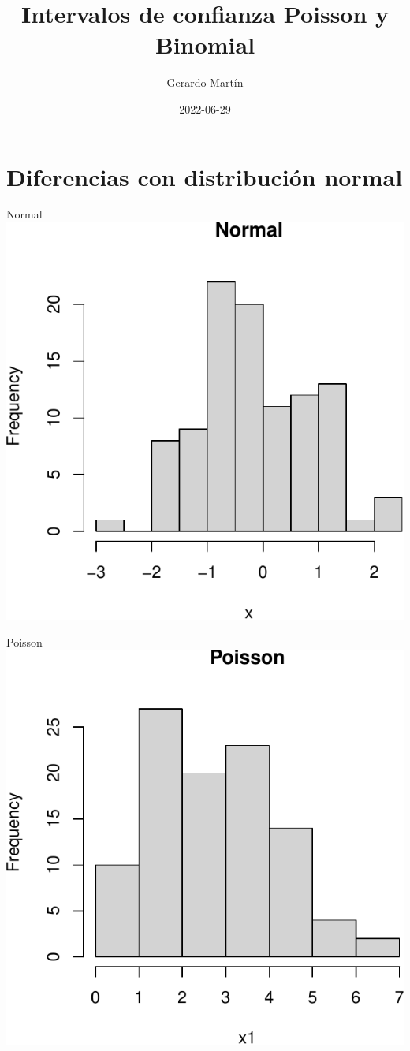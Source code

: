\documentclass[
  11pt,
  ignorenonframetext,
]{beamer}
\title{Intervalos de confianza Poisson y Binomial}
\author{Gerardo Martín}
\date{2022-06-29}
\begin{document}
\frame{\titlepage}

\hypertarget{diferencias-con-distribuciuxf3n-normal}{%
\section{Diferencias con distribución
normal}\label{diferencias-con-distribuciuxf3n-normal}}

\begin{frame}{Normal}
\protect\hypertarget{normal}{}
\includegraphics{Intervalos-poisson_files/figure-beamer/unnamed-chunk-1-1.pdf}
\end{frame}

\begin{frame}{Poisson}
\protect\hypertarget{poisson}{}
\includegraphics{Intervalos-poisson_files/figure-beamer/unnamed-chunk-2-1.pdf}
\end{frame}
\end{document}
